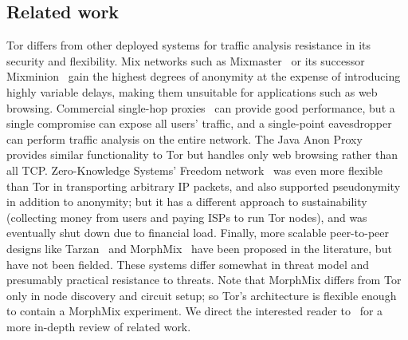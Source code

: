 \documentclass{llncs}
\begin{document}
\subsection{Related work}
Tor differs from other deployed systems for traffic analysis resistance
in its security and flexibility.  Mix networks such as
Mixmaster~\cite{mixmaster-spec} or its successor Mixminion~\cite{minion-design}
gain the highest degrees of anonymity at the expense of introducing highly
variable delays, making them unsuitable for applications such as web
browsing.  Commercial single-hop
proxies~\cite{anonymizer} can provide good performance, but
a single compromise can expose all users' traffic, and a single-point
eavesdropper can perform traffic analysis on the entire network.
The Java
Anon Proxy~\cite{web-mix} provides similar functionality to Tor but
handles only web browsing rather than all TCP\@.
Zero-Knowledge Systems' Freedom
network~\cite{freedom21-security} was even more flexible than Tor in
transporting arbitrary IP packets, and also supported
pseudonymity in addition to anonymity; but it has
a different approach to sustainability (collecting money from users
and paying ISPs to run Tor nodes), and was eventually shut down due to financial
load.  Finally,
more scalable peer-to-peer designs like Tarzan~\cite{tarzan:ccs02} and
MorphMix~\cite{morphmix:fc04} have been proposed in the literature, but
have not been fielded. These systems differ somewhat
in threat model and presumably practical resistance to threats.
Note that MorphMix differs from Tor only in
node discovery and circuit setup; so Tor's architecture is flexible
enough to contain a MorphMix experiment.
We direct the interested reader
to~\cite{tor-design} for a more in-depth review of related work.


\end{document}
